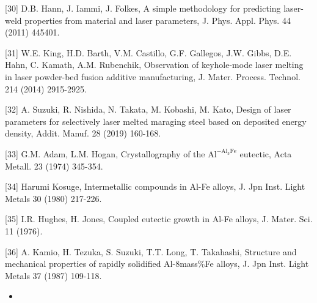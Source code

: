 \documentclass[10pt]{article}
\begin{document}
[30] D.B. Hann, J. Iammi, J. Folkes, A simple methodology for predicting laser-weld properties from material and laser parameters, J. Phys. Appl. Phys. 44 (2011) 445401.

[31] W.E. King, H.D. Barth, V.M. Castillo, G.F. Gallegos, J.W. Gibbs, D.E. Hahn, C. Kamath, A.M. Rubenchik, Observation of keyhole-mode laser melting in laser powder-bed fusion additive manufacturing, J. Mater. Process. Technol. 214 (2014) 2915-2925.

[32] A. Suzuki, R. Nishida, N. Takata, M. Kobashi, M. Kato, Design of laser parameters for selectively laser melted maraging steel based on deposited energy density, Addit. Manuf. 28 (2019) 160-168.

[33] G.M. Adam, L.M. Hogan, Crystallography of the $\mathrm{Al}^{-\mathrm{Al}_{3} \mathrm{Fe}}$ eutectic, Acta Metall. 23 (1974) 345-354.

[34] Harumi Kosuge, Intermetallic compounds in Al-Fe alloys, J. Jpn Inst. Light Metals 30 (1980) 217-226.

[35] I.R. Hughes, H. Jones, Coupled eutectic growth in Al-Fe alloys, J. Mater. Sci. 11 (1976).

[36] A. Kamio, H. Tezuka, S. Suzuki, T.T. Long, T. Takahashi, Structure and mechanical properties of rapidly solidified Al-8mass\%Fe alloys, J. Jpn Inst. Light Metals 37 (1987) 109-118.

\begin{itemize}
  \item 
\end{itemize}
\end{document}
